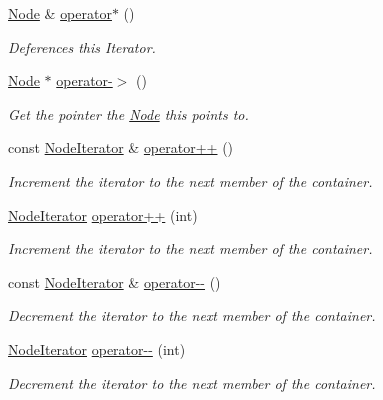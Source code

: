 \begin{DoxyCompactItemize}
\hyperlink{classphys_1_1xml_1_1Node}{Node} \& \hyperlink{classphys_1_1xml_1_1NodeIterator_a3af8dd5a0b7b4c42cad57589ae3feb48}{operator$\ast$} ()
\begin{DoxyCompactList}\small\item\em Deferences this Iterator. \item\end{DoxyCompactList}\item 
\hyperlink{classphys_1_1xml_1_1Node}{Node} $\ast$ \hyperlink{classphys_1_1xml_1_1NodeIterator_a32b9af9cfa38f9ffe5d9243b9c0565cb}{operator-\/$>$} ()
\begin{DoxyCompactList}\small\item\em Get the pointer the \hyperlink{classphys_1_1xml_1_1Node}{Node} this points to. \item\end{DoxyCompactList}\item 
\hypertarget{classphys_1_1xml_1_1NodeIterator_afeef29c3850b37585507873a2a076d8c}{
const \hyperlink{classphys_1_1xml_1_1NodeIterator}{NodeIterator} \& \hyperlink{classphys_1_1xml_1_1NodeIterator_afeef29c3850b37585507873a2a076d8c}{operator++} ()}
\label{classphys_1_1xml_1_1NodeIterator_afeef29c3850b37585507873a2a076d8c}

\begin{DoxyCompactList}\small\item\em Increment the iterator to the next member of the container. \item\end{DoxyCompactList}\item 
\hyperlink{classphys_1_1xml_1_1NodeIterator}{NodeIterator} \hyperlink{classphys_1_1xml_1_1NodeIterator_a3c0b341d6b90e9607bb6b3ae8f6dbfbf}{operator++} (int)
\begin{DoxyCompactList}\small\item\em Increment the iterator to the next member of the container. \item\end{DoxyCompactList}\item 
const \hyperlink{classphys_1_1xml_1_1NodeIterator}{NodeIterator} \& \hyperlink{classphys_1_1xml_1_1NodeIterator_a97d315fce355d0c48322172d248a5138}{operator-\/-\/} ()
\begin{DoxyCompactList}\small\item\em Decrement the iterator to the next member of the container. \item\end{DoxyCompactList}\item 
\hyperlink{classphys_1_1xml_1_1NodeIterator}{NodeIterator} \hyperlink{classphys_1_1xml_1_1NodeIterator_a331a62c9765a66cc9659c75fb58f7ad8}{operator-\/-\/} (int)
\begin{DoxyCompactList}\small\item\em Decrement the iterator to the next member of the container. \item\end{DoxyCompactList}\end{DoxyCompactItemize}
